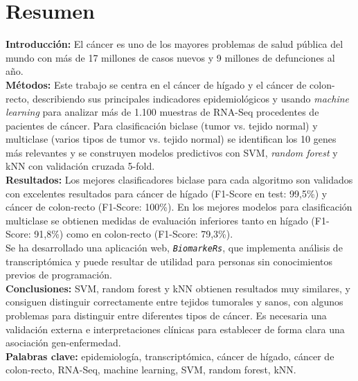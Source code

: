 \thispagestyle{plain}


\vspace{-30pt}

\section*{Resumen}

\textbf{Introducción:} El cáncer es uno de los mayores problemas de salud pública del mundo con más de 17 millones de casos nuevos y 9 millones de defunciones al año. \\

\textbf{Métodos:} Este trabajo se centra en el cáncer de hígado y el cáncer de colon-recto, describiendo sus principales indicadores epidemiológicos y usando \textit{machine learning} para analizar más de 1.100 muestras de RNA-Seq procedentes de pacientes de cáncer. Para clasificación biclase (tumor vs. tejido normal) y multiclase (varios tipos de tumor vs. tejido normal) se identifican los 10 genes más relevantes y se construyen modelos predictivos con SVM, \textit{random forest} y kNN con validación cruzada 5-fold.\\

\textbf{Resultados:} Los mejores clasificadores biclase para cada algoritmo son validados con excelentes resultados para cáncer de hígado (F1-Score en test: 99,5\%) y cáncer de colon-recto (F1-Score: 100\%). En los mejores modelos para clasificación multiclase se obtienen medidas de evaluación inferiores tanto en hígado (F1-Score: 91,8\%) como en colon-recto (F1-Score: 79,3\%).\\

Se ha desarrollado una aplicación web, \texttt{\textit{BiomarkeRs}}, que implementa análisis de transcriptómica y puede resultar de utilidad para personas sin conocimientos previos de programación.\\

\textbf{Conclusiones:} SVM, random forest y kNN obtienen resultados muy similares, y consiguen distinguir correctamente entre tejidos tumorales y sanos, con algunos problemas para distinguir entre diferentes tipos de cáncer. Es necesaria una validación externa e interpretaciones clínicas para establecer de forma clara una asociación gen-enfermedad.\\

\textbf{Palabras clave:} epidemiología, transcriptómica, cáncer de hígado, cáncer de colon-recto, RNA-Seq, machine learning, SVM, random forest, kNN.

